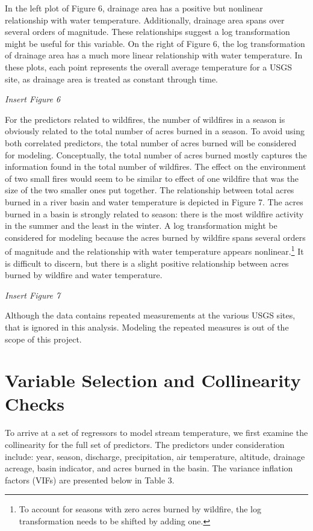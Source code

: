 \documentclass[
]{article}
\begin{document}
In the left plot of Figure 6, drainage area has a positive but nonlinear
relationship with water temperature. Additionally, drainage area spans
over several orders of magnitude. These relationships suggest a log
transformation might be useful for this variable. On the right of Figure
6, the log transformation of drainage area has a much more linear
relationship with water temperature. In these plots, each point
represents the overall average temperature for a USGS site, as drainage
area is treated as constant through time.

\emph{Insert Figure 6}

For the predictors related to wildfires, the number of wildfires in a
season is obviously related to the total number of acres burned in a
season. To avoid using both correlated predictors, the total number of
acres burned will be considered for modeling. Conceptually, the total
number of acres burned mostly captures the information found in the
total number of wildfires. The effect on the environment of two small
fires would seem to be similar to effect of one wildfire that was the
size of the two smaller ones put together. The relationship between
total acres burned in a river basin and water temperature is depicted in
Figure 7. The acres burned in a basin is strongly related to season:
there is the most wildfire activity in the summer and the least in the
winter. A log transformation might be considered for modeling because
the acres burned by wildfire spans several orders of magnitude and the
relationship with water temperature appears nonlinear.\footnote{To
  account for seasons with zero acres burned by wildfire, the log
  transformation needs to be shifted by adding one.} It is difficult to
discern, but there is a slight positive relationship between acres
burned by wildfire and water temperature.

\emph{Insert Figure 7}

Although the data contains repeated measurements at the various USGS
sites, that is ignored in this analysis. Modeling the repeated measures
is out of the scope of this project.

\hypertarget{variable-selection-and-collinearity-checks}{%
\section{Variable Selection and Collinearity
Checks}\label{variable-selection-and-collinearity-checks}}

To arrive at a set of regressors to model stream temperature, we first
examine the collinearity for the full set of predictors. The predictors
under consideration include: year, season, discharge, precipitation, air
temperature, altitude, drainage acreage, basin indicator, and acres
burned in the basin. The variance inflation factors (VIFs) are presented
below in Table 3.
\end{document}

